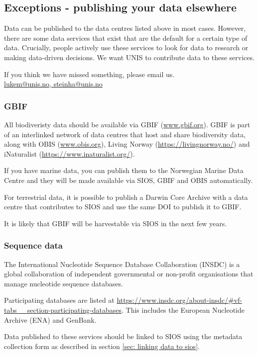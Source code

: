 \documentclass[a4paper,12pt]{article}
\makeatletter
\newcommand{\emailauthors}{\href{mailto:lukem@unis.no,steinha@unis.no}{lukem@unis.no, steinha@unis.no}}
\makeatother
\begin{document}
\subsection{Exceptions - publishing your data elsewhere}

Data can be published to the data centres listed above in most cases. However, there are some data services that exist that are the default for a certain type of data. Crucially, people actively use these services to look for data to research or making data-driven decisions. We want UNIS to contribute data to these services. 

If you think we have missed something, please email us.\\

\emailauthors

\subsubsection{GBIF}

All biodiveristy data should be available via GBIF (\url{www.gbif.org}). GBIF is part of an interlinked network of data centres that host and share biodiversity data, along with OBIS (\url{www.obis.org}), Living Norway (\url{https://livingnorway.no/}) and iNaturalist (\url{https://www.inaturalist.org/}). 

If you have marine data, you can publish them to the Norwegian Marine Data Centre and they will be made available via SIOS, GBIF and OBIS automatically.

For terrestrial data, it is possible to publish a Darwin Core Archive with a data centre that contributes to SIOS and use the same DOI to publish it to GBIF. 

It is likely that GBIF will be harvestable via SIOS in the next few years.

\subsubsection{Sequence data}

The International Nucleotide Sequence Database Collaboration (INSDC) is a global collaboration of independent governmental or non-profit organisations that manage nucleotide sequence databases.

Participating databases are listed at \url{
https://www.insdc.org/about-insdc/#vf-tabs__section-participating-databases}. This includes the European Nucleotide Archive (ENA) and GenBank.

Data published to these services should be linked to SIOS using the metadata collection form as described in section \ref{sec: linking data to sios}.
\end{document}
